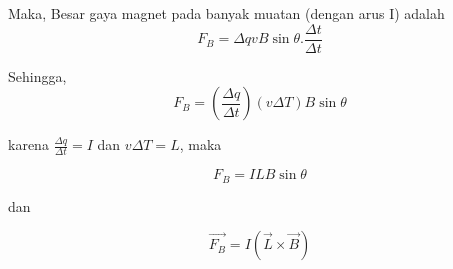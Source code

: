 \documentclass[twocolumn, 11pt]{article}%
\begin{document}
Maka, Besar gaya magnet pada banyak muatan (dengan arus I) adalah
\[ F_B = \Delta qvB\sin\theta.\frac{\Delta t}{\Delta t} \]

Sehingga,
\[ F_B = \left(\frac{\Delta q}{\Delta t}\right)(v\Delta T)B\sin\theta \]

karena $\displaystyle \frac{\Delta q}{\Delta t}=I$ dan $v\Delta T=L$,
maka

\[ F_B = ILB\sin\theta \]

dan

\[ \overrightarrow{F_B} = I(\vec L\times\vec B) \]
\end{document}
